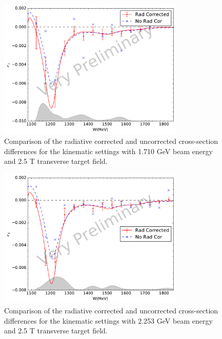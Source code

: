 \begin{figure}[p!]
  \centering
  \includegraphics[width=0.79\textwidth]{figs/xsdiff-model-17102590.pdf}
  \caption[Cross-section differences with $E=1.710$ GeV and $B=2.5$ T.]{Comparison of the radiative corrected and uncorrected cross-section differences for the kinematic settings with 1.710 GeV beam energy and 2.5 T transverse target field. \label{C8S3F2}}
\end{figure}

\begin{figure}[p!]
  \centering
  \includegraphics[width=0.79\textwidth]{figs/xsdiff-model-22532590.pdf}
  \caption[Cross-section differences with $E=2.253$ GeV and $B=2.5$ T.]{Comparison of the radiative corrected and uncorrected cross-section differences for the kinematic settings with 2.253 GeV beam energy and 2.5 T transverse target field. \label{C8S3F3}}
\end{figure}

